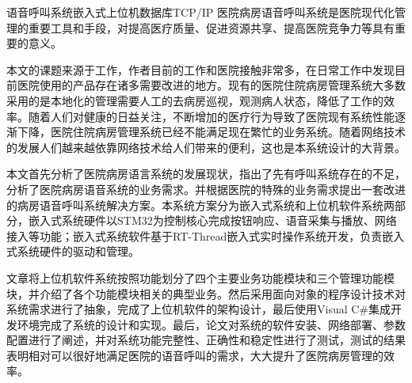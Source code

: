 
\begin{Cabstract}{语音呼叫系统}{嵌入式}{上位机}{数据库}{TCP/IP}
医院病房语音呼叫系统是医院现代化管理的重要工具和手段，对提高医疗质量、促进资源共享、提高医院竞争力等具有重要的意义。

本文的课题来源于工作，作者目前的工作和医院接触非常多，在日常工作中发现目前医院使用的产品存在诸多需要改进的地方。现有的医院住院病房管理系统大多数采用的是本地化的管理需要人工的去病房巡视，观测病人状态，降低了工作的效率。随着人们对健康的日益关注，不断增加的医疗行为导致了医院现有系统性能逐渐下降，医院住院病房管理系统已经不能满足现在繁忙的业务系统。随着网络技术的发展人们越来越依靠网络技术给人们带来的便利，这也是本系统设计的大背景。

本文首先分析了医院病房语言系统的发展现状，指出了先有呼叫系统存在的不足，分析了医院病房语音系统的业务需求。并根据医院的特殊的业务需求提出一套改进的病房语音呼叫系统解决方案。本系统方案分为嵌入式系统和上位机软件系统两部分，嵌入式系统硬件以STM32为控制核心完成按钮响应、语音采集与播放、网络接入等功能；嵌入式系统软件基于RT-Thread嵌入式实时操作系统开发，负责嵌入式系统硬件的驱动和管理。

文章将上位机软件系统按照功能划分了四个主要业务功能模块和三个管理功能模块，并介绍了各个功能模块相关的典型业务。然后采用面向对象的程序设计技术对系统需求进行了抽象，完成了上位机软件的架构设计，最后使用Visual C{\#}集成开发环境完成了系统的设计和实现。最后，论文对系统的软件安装、网络部署、参数配置进行了阐述，并对系统功能完整性、正确性和稳定性进行了测试，测试的结果表明相对可以很好地满足医院的语音呼叫的需求，大大提升了医院病房管理的效率。
\end{Cabstract}
